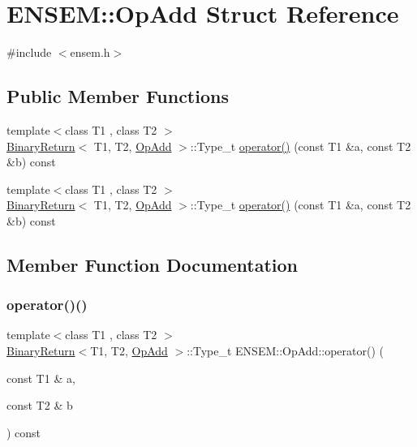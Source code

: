 \hypertarget{structENSEM_1_1OpAdd}{}\section{E\+N\+S\+EM\+:\+:Op\+Add Struct Reference}
\label{structENSEM_1_1OpAdd}


{\ttfamily \#include $<$ensem.\+h$>$}

\subsection*{Public Member Functions}
\begin{DoxyCompactItemize}
\item 
{\footnotesize template$<$class T1 , class T2 $>$ }\\\mbox{\hyperlink{structENSEM_1_1BinaryReturn}{Binary\+Return}}$<$ T1, T2, \mbox{\hyperlink{structENSEM_1_1OpAdd}{Op\+Add}} $>$\+::Type\+\_\+t \mbox{\hyperlink{structENSEM_1_1OpAdd_a5929c83274ec805686f85b4e65bd70c6}{operator()}} (const T1 \&a, const T2 \&b) const
\item 
{\footnotesize template$<$class T1 , class T2 $>$ }\\\mbox{\hyperlink{structENSEM_1_1BinaryReturn}{Binary\+Return}}$<$ T1, T2, \mbox{\hyperlink{structENSEM_1_1OpAdd}{Op\+Add}} $>$\+::Type\+\_\+t \mbox{\hyperlink{structENSEM_1_1OpAdd_a5929c83274ec805686f85b4e65bd70c6}{operator()}} (const T1 \&a, const T2 \&b) const
\end{DoxyCompactItemize}


\subsection{Member Function Documentation}
\mbox{\label{structENSEM_1_1OpAdd_a5929c83274ec805686f85b4e65bd70c6}} 
\subsubsection{\texorpdfstring{operator()()}{operator()()}\hspace{0.1cm}{\footnotesize\ttfamily [1/2]}}
{\footnotesize\ttfamily template$<$class T1 , class T2 $>$ \\
\mbox{\hyperlink{structENSEM_1_1BinaryReturn}{Binary\+Return}}$<$T1, T2, \mbox{\hyperlink{structENSEM_1_1OpAdd}{Op\+Add}} $>$\+::Type\+\_\+t E\+N\+S\+E\+M\+::\+Op\+Add\+::operator() (\begin{DoxyParamCaption}\item[{const T1 \&}]{a,  }\item[{const T2 \&}]{b }\end{DoxyParamCaption}) const\hspace{0.3cm}{\ttfamily [inline]}}

